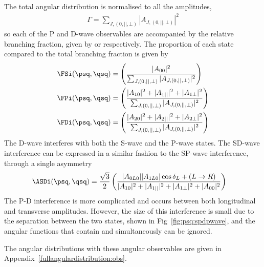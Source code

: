 The total angular distribution is normalised to all the \kpi amplitudes,
\begin{align}
\Gamma = \sum_{J,(0,||,\bot)} |A_{J,(0,||,\bot)}|^2
\end{align}
so each of the P and D-wave observables are accompanied by the relative branching fraction, given by \FPi or \FDi respectively.
The proportion of each \kpi state compared to the total branching fraction is given by
\begin{subequations}\begin{align}
\FSi(\psq,\qsq) &= \left( \frac{|A_{00}|^2 }{\sum_{J,(0,||,\bot)} |A_{J,(0,||,\bot)}|^2} \right) \\
\FPi(\psq,\qsq) &= \left( \frac{|A_{10}|^2 + |A_{1||}|^2 + |A_{1\bot}|^2 }{\sum_{J,(0,||,\bot)} |A_{J,(0,||,\bot)}|^2} \right) \\
\FDi(\psq,\qsq) &= \left( \frac{|A_{20}|^2 + |A_{2||}|^2 + |A_{2\bot}|^2 }{\sum_{J,(0,||,\bot)} |A_{J,(0,||,\bot)}|^2} \right) 
\end{align}\end{subequations}
The D-wave interferes with both the S-wave and the P-wave states.
The SD-wave interference can be expressed in a similar fashion to the 
SP-wave interference, through a single asymmetry
\begin{align}
\ASDi(\psq,\qsq)  &= \frac{\sqrt{3}}{2} \left( \frac{ |A_{0L0}||A_{1L0}|\cos\delta_L
+ (L\to R)}{|A_{10}|^2 + |A_{1||}|^2 + |A_{1\bot}|^2 + |A_{00}|^2}\right)
\end{align}
The P-D interference is more complicated and occurs between both longitudinal and transverse amplitudes.
However, the size of this interference is small due to the separation between the two states, shown in Fig~\ref{fig:psq:spdpwave}, 
and the angular functions that contain \FPi and \FDi simultaneously can be ignored.

The angular distributions with these angular observables are given in Appendix~\ref{fullangulardistribution:obs}.

